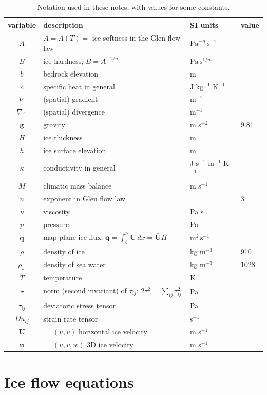 \documentclass[letterpaper,final,12pt,reqno]{amsart}
\newcommand{\bq}{\mathbf{q}}
\newcommand{\bU}{\mathbf{U}}
\begin{document}
\begin{table}[ht]
\caption{Notation used in these notes, with values for some constants.}
\begin{tabular}{clll}
variable  & description & SI units & value \\
\hline
$A$ & $A=A(T)=$ ice softness in the Glen flow law & $\text{Pa}^{-n}\,\text{s}^{-1}$ \\
$B$ & ice hardness; $B=A^{-1/n}$ & $\text{Pa}\,\text{s}^{1/n}$ \\
$b$ & bedrock elevation & m \\
$c$ & specific heat in general & J kg$^{-1}$ K$^{-1}$ \\
$\nabla$ & (spatial) gradient & m$^{-1}$ \\
$\nabla\cdot$ & (spatial) divergence & m$^{-1}$ \\
$\mathbf{g}$ & gravity & m s$^{-2}$\phantom{foobar} & 9.81 \\
$H$ & ice thickness & m \\
$h$ & ice surface elevation & m \\
$\kappa$ & conductivity in general & J s$^{-1}$ m$^{-1}$ K$^{-1}$ \\
$M$ & climatic mass balance & m s$^{-1}$ \\
$n$ & exponent in Glen flow law & & 3 \\
$\nu$ & viscosity & Pa s \\
$p$ & pressure & Pa \\
$\bq$ & map-plane ice flux: $\bq = \int_{b}^{h} \bU\,dx = \bar{\bU} H$ & $\text{m}^2\,\text{s}^{-1}$ \\
$\rho$ & density of ice & kg m$^{-3}$ & 910 \\
$\rho_w$ & density of sea water & kg m$^{-3}$ & 1028 \\
$T$ & temperature & K \\
$\tau$ & norm (second invariant) of $\tau_{ij}$: $2 \tau^2 = \sum_{ij} \tau_{ij}^2$ & Pa \\
$\tau_{ij}$ & deviatoric stress tensor & Pa \\
$Du_{ij}$ & strain rate tensor & s$^{-1}$ \\
$\mathbf{U}$ & $=(u,v)$ horizontal ice velocity & m s$^{-1}$ \\
$\mathbf{u}$ & $=(u,v,w)$ 3D ice velocity & m s$^{-1}$ \\
\end{tabular}
\label{tab:notation}
\end{table}


\section{Ice flow equations}
\end{document}
